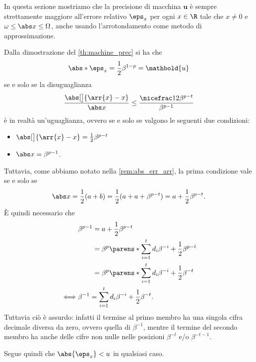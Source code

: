 In questa sezione mostriamo che la precisione di macchina $\mathbold{u}$ è sempre strettamente maggiore all'errore relativo $\eps_x$ per ogni $x \in \R$ tale che $x \neq 0$ e $\omega \leq \abs x \leq \Omega$, anche usando l'arrotondamento come metodo di approssimazione.

Dalla dimostrazione del \autoref{th:machine_prec} si ha che \[
    \abs*{\eps_x} = \frac12\beta^{1-p} = \mathbold{u}
\] se e solo se la disuguaglianza \[
    \frac{\abs[\big]{\arr{x} - x}}{\abs x} 
    \leq \frac{\nicefrac12\beta^{p-t}}{\beta^{p-1}}
\] è in realtà un'uguaglianza, ovvero se e solo se valgono le seguenti due condizioni:
\begin{itemize}
    \item $\abs[\big]{\arr{x} - x} = \frac12\beta^{p-t}$
    \item $\abs x = \beta^{p-1}$.
\end{itemize}
Tuttavia, come abbiamo notato nella \autoref{rem:abs_err_arr}, la prima condizione vale se e solo se \[
    \abs x = \frac12(a+b) = \frac12(a + a + \beta^{p-t}) = a + \frac12\beta^{p-t}.
\] È quindi necessario che \begin{align*}
    &\beta^{p-1} 
        \begin{aligned}[t] 
            &= a + \frac12\beta^{p-t} \\
            &= \beta^p \parens*{\sum_{i=1}^t d_i\beta^{-i}} + \frac12\beta^{p-t} \\
            &= \beta^p \parens*{\sum_{i=1}^t d_i\beta^{-i} + \frac12\beta^{-t}}
        \end{aligned} \\
    \iff &\beta^{-1} = \sum_{i=1}^t d_i\beta^{-i} + \frac12\beta^{-t}.
\end{align*} Tuttavia ciò è assurdo: infatti il termine al primo membro ha una singola cifra decimale diversa da zero, ovvero quella di $\beta^{-1}$, mentre il termine del secondo membro ha anche delle cifre non nulle nelle posizioni $\beta^{-t}$ e/o $\beta^{-t-1}$.  

Segue quindi che $\abs{\eps_x} < u$ in qualsiasi caso.
